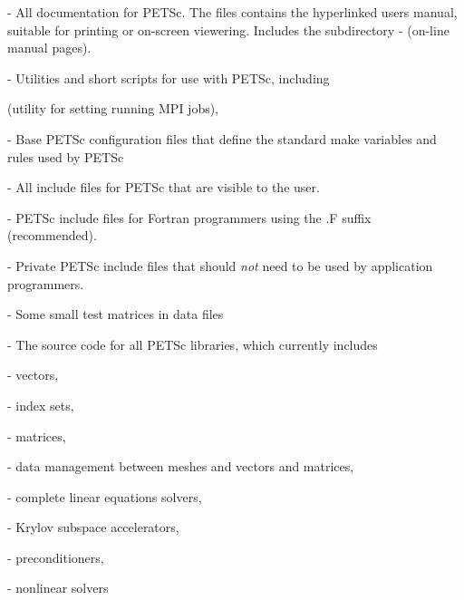 \begin{tightitemize}
\item {} - All documentation for PETSc. The files 
                   contains the hyperlinked users manual, suitable for printing
                   or on-screen viewering. Includes the subdirectory
 \subitem -  (on-line manual pages).
\item {} - Utilities and short scripts for use with PETSc, including
 \begin{tightitemize}
 \item {} (utility for setting running MPI jobs),
 \end{tightitemize}

\item {} - Base PETSc configuration files that define the standard make variables and rules used by PETSc
\item {} - All include files for PETSc that are visible to the user.
\item {}    - PETSc include files for Fortran programmers using
                                  the .F suffix (recommended).
\item {}    - Private PETSc include files that should {\em not}
                                 need to be used by application programmers.
\item {} - Some small test matrices in data files
\item {} - The source code for all PETSc libraries, which
                  currently includes
 \begin{tightitemize}
 \item {} - vectors,
   \begin{tightitemize}
     \item {} - index sets,
   \end{tightitemize}
 \item {} - matrices,
 \item {} - data management between meshes and vectors and matrices,
 \item {} - complete linear equations solvers,
 \begin{tightitemize}
   \item {} - Krylov subspace accelerators,
   \item {} - preconditioners,
 \end{tightitemize}
 \item {} - nonlinear solvers

\end{tightitemize}
\end{tightitemize}
